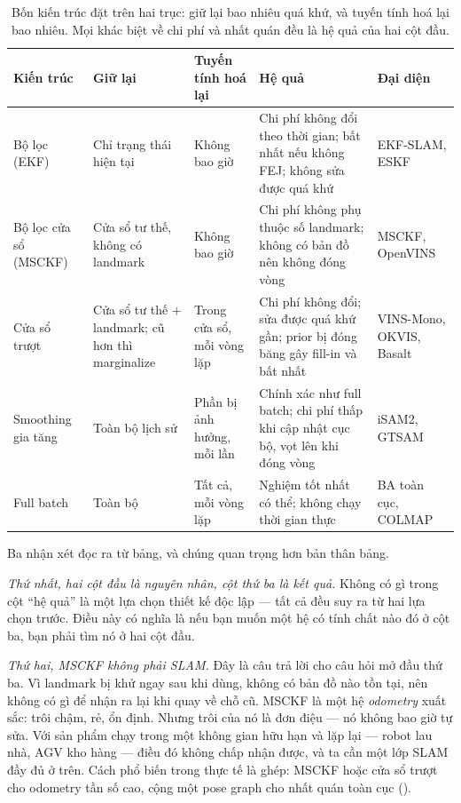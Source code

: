 \documentclass[../../vslam.tex]{subfiles}
\begin{document}
\begin{table}[H]\centering\small
\caption{Bốn kiến trúc đặt trên hai trục: giữ lại bao nhiêu quá khứ, và tuyến tính hoá lại bao nhiêu. Mọi khác biệt về chi phí và nhất quán đều là hệ quả của hai cột đầu.}
\label{tab:b09-paradigm}
\begin{tabularx}{\linewidth}{@{}L{2.5cm}L{2.4cm}L{2.2cm}YL{2.1cm}@{}}
\toprule
\textbf{Kiến trúc} & \textbf{Giữ lại} & \textbf{Tuyến tính hoá lại} & \textbf{Hệ quả} & \textbf{Đại diện}\\
\midrule
Bộ lọc (EKF) & Chỉ trạng thái hiện tại & Không bao giờ & Chi phí không đổi theo thời gian; bất nhất nếu không FEJ; không sửa được quá khứ & EKF-SLAM, ESKF\\
Bộ lọc cửa sổ (MSCKF) & Cửa sổ tư thế, không có landmark & Không bao giờ & Chi phí không phụ thuộc số landmark; không có bản đồ nên không đóng vòng & MSCKF, OpenVINS\\
Cửa sổ trượt & Cửa sổ tư thế \(+\) landmark; cũ hơn thì marginalize & Trong cửa sổ, mỗi vòng lặp & Chi phí không đổi; sửa được quá khứ gần; prior bị đóng băng gây fill-in và bất nhất & VINS-Mono, OKVIS, Basalt\\
Smoothing gia tăng & Toàn bộ lịch sử & Phần bị ảnh hưởng, mỗi lần & Chính xác như full batch; chi phí thấp khi cập nhật cục bộ, vọt lên khi đóng vòng & iSAM2, GTSAM\\
Full batch & Toàn bộ & Tất cả, mỗi vòng lặp & Nghiệm tốt nhất có thể; không chạy thời gian thực & BA toàn cục, COLMAP\\
\bottomrule
\end{tabularx}
\end{table}

Ba nhận xét đọc ra từ bảng, và chúng quan trọng hơn bản thân bảng.

\emph{Thứ nhất, hai cột đầu là nguyên nhân, cột thứ ba là kết quả.} Không có gì trong cột ``hệ quả'' là một lựa chọn thiết kế độc lập --- tất cả đều suy ra từ hai lựa chọn trước. Điều này có nghĩa là nếu bạn muốn một hệ có tính chất nào đó ở cột ba, bạn phải tìm nó ở hai cột đầu.

\emph{Thứ hai, MSCKF không phải SLAM.} Đây là câu trả lời cho câu hỏi mở đầu thứ ba. Vì landmark bị khử ngay sau khi dùng, không có bản đồ nào tồn tại, nên không có gì để nhận ra lại khi quay về chỗ cũ. MSCKF là một hệ \emph{odometry} xuất sắc: trôi chậm, rẻ, ổn định. Nhưng trôi của nó là đơn điệu --- nó không bao giờ tự sửa. Với sản phẩm chạy trong một không gian hữu hạn và lặp lại --- robot lau nhà, AGV kho hàng --- điều đó không chấp nhận được, và ta cần một lớp SLAM đầy đủ ở trên. Cách phổ biến trong thực tế là ghép: MSCKF hoặc cửa sổ trượt cho odometry tần số cao, cộng một pose graph cho nhất quán toàn cục ().
\end{document}
